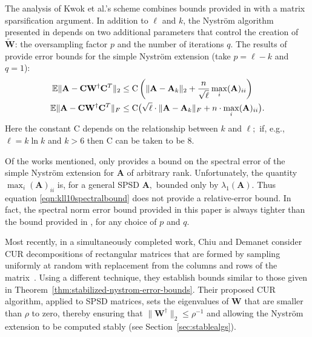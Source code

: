 \documentclass[11pt,letterpaper,twoside,reqno,nosumlimits]{amsart}
\def\pinv{\dagger}
\def\transp{T}
\newcommand{\mat}[1]{\ensuremath{\mathbf{#1}}}
\newcommand{\E}{\ensuremath{\mathbb{E}}}
\newcommand{\snorm}[1]{\ensuremath{\big\|#1\big\|_2}}
\newcommand{\const}[1]{\ensuremath{\mathrm{#1}}}
\theoremstyle{remark}
\begin{document}
 The analysis of Kwok et al.'s scheme combines bounds provided in \cite{HMT11} with a matrix sparsification argument. In addition to $\ell$ and $k$, the Nystr\"om algorithm presented in \cite{KLL10} depends on two additional parameters that control the creation of $\tilde{\mat{W}}$: the oversampling factor $p$ and the number of iterations $q.$ 
The results of \cite{KLL10} provide error bounds for the simple Nystr\"om extension (take $p = \ell -k$ and $q=1$):
\begin{align}
 \E\| \mat{A} - \mat{C}\mat{W}^\pinv \mat{C}^\transp\|_2 & \leq \const{C} \left(\|\mat{A} - \mat{A}_k\|_2 + \frac{n}{\sqrt{\ell}} \max_i (\mat{A})_{ii} \right) \label{eqn:kll10spectralbound}\\
 \E\| \mat{A} - \mat{C}\mat{W}^\pinv \mat{C}^\transp\|_F & \leq \const{C} \big( \sqrt{\ell} \cdot \|\mat{A} - \mat{A}_k\|_F + n \cdot \max_i (\mat{A})_{ii} \big). \notag
\end{align}
Here the constant $\const{C}$ depends on the relationship between $k$ and $\ell;$ if, e.g., $\ell = k \ln k$ and $k > 6$ then $\const{C}$ can be taken to be 8. 

Of the works mentioned, only \cite{KLL10} provides a bound on the spectral error of the simple Nystr\"om extension for $\mat{A}$ of arbitrary rank. Unfortunately, the quantity $\max_i (\mat{A})_{ii}$ is, for a general SPSD $\mat{A},$ bounded only by $\lambda_1(\mat{A}).$ Thus equation \eqref{eqn:kll10spectralbound} does not provide a relative-error bound. In fact, the spectral norm error bound provided in this paper is always tighter than the bound provided in \cite{KLL10}, for any choice of $p$ and $q.$ 
 
Most recently, in a simultaneously completed work, Chiu and Demanet consider CUR decompositions of rectangular matrices that are formed by sampling uniformly at random with replacement from the columns and rows of the matrix~\cite{CD11}. Using a different technique, they establish bounds similar to those given in Theorem~\ref{thm:stabilized-nystrom-error-bounds}. Their proposed CUR algorithm, applied to SPSD matrices, sets the eigenvalues of $\mat{W}$ that are smaller than $\rho$ to zero, thereby ensuring that $\snorm{\mat{W}^\pinv} \leq \rho^{-1}$ and allowing the Nystr\"om extension to be computed stably (see Section~\ref{sec:stablealgs}). 
\end{document}
